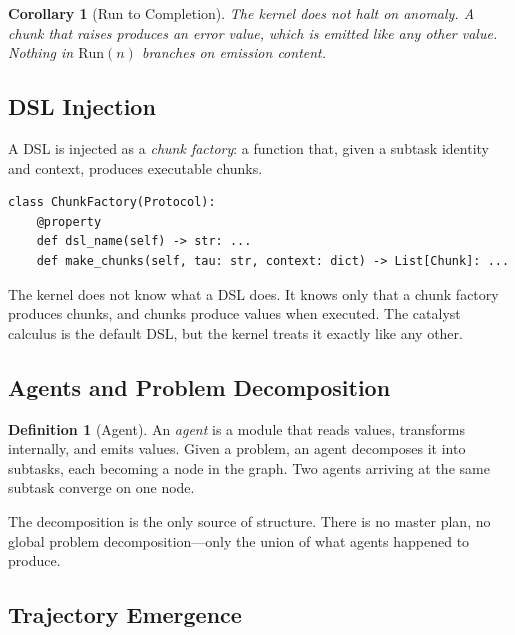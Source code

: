 \documentclass[11pt,a4paper]{article}
\newtheorem{corollary}[theorem]{Corollary}
\theoremstyle{definition}
\newtheorem{definition}[theorem]{Definition}
\theoremstyle{remark}
\begin{document}
\begin{corollary}[Run to Completion]
\label{cor:completion-kernel}
The kernel does not halt on anomaly. A chunk that raises produces an error value, which is emitted like any other value. Nothing in $\mathrm{Run}(n)$ branches on emission content.
\end{corollary}

\subsection{DSL Injection}

A DSL is injected as a \emph{chunk factory}: a function that, given a subtask identity and context, produces executable chunks.

\begin{tcolorbox}[colback=gray!5,colframe=gray!50,title=Chunk Factory Protocol]
\begin{lstlisting}[style=python,numbers=none]
class ChunkFactory(Protocol):
    @property
    def dsl_name(self) -> str: ...
    def make_chunks(self, tau: str, context: dict) -> List[Chunk]: ...
\end{lstlisting}
\end{tcolorbox}

The kernel does not know what a DSL does. It knows only that a chunk factory produces chunks, and chunks produce values when executed. The catalyst calculus is the default DSL, but the kernel treats it exactly like any other.

\subsection{Agents and Problem Decomposition}

\begin{definition}[Agent]
An \emph{agent} is a module that reads values, transforms internally, and emits values. Given a problem, an agent decomposes it into subtasks, each becoming a node in the graph. Two agents arriving at the same subtask converge on one node.
\end{definition}

The decomposition is the only source of structure. There is no master plan, no global problem decomposition---only the union of what agents happened to produce.

\subsection{Trajectory Emergence}
\end{document}
